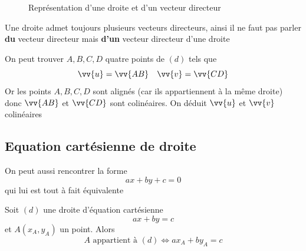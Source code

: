 \begin{figure}[H]
\centering
{}
\caption{Représentation d'une droite et d'un vecteur directeur}
\end{figure}

\begin{remarque}
Une droite admet toujours plusieurs vecteurs directeurs, ainsi il ne faut pas parler \textbf{du} vecteur directeur mais \textbf{d'un} vecteur directeur d'une droite
\end{remarque}
\newline

\newline

\begin{preuve}
On peut trouver $A,B,C,D$ quatre points de $(d)$ tels que 
$$\vv{u} = \vv{AB} \quad \vv{v} = \vv{CD}$$
Or les points $A,B,C,D$ sont alignés (car ils appartiennent à la même droite) donc $\vv{AB}$ et $\vv{CD}$ sont colinéaires. On déduit $\vv{u}$ et $\vv{v}$ colinéaires
\end{preuve}
\subsection{Equation cartésienne de droite}
\newline

\begin{remarque}
On peut aussi rencontrer la forme 
$$ax +by +c = 0$$
qui lui est tout à fait équivalente
\end{remarque}
Soit $(d)$ une droite d'équation cartésienne $$ax+by=c$$ et $A(x_A,y_A)$ un point. Alors $$ A \text{ appartient à } (d) \Leftrightarrow ax_A +by_A=c$$ 

